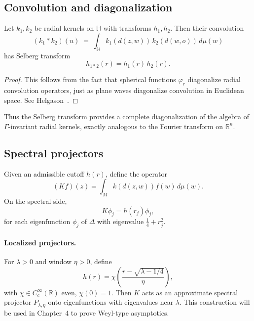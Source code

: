 
\subsection{Convolution and diagonalization}

\begin{lemma}
Let $k_1, k_2$ be radial kernels on $\mathbb{H}$ with transforms $h_1, h_2$.
Then their convolution
\[
  (k_1 * k_2)(u) \;=\; \int_{\mathbb{H}} k_1(d(z,w))\,k_2(d(w,o))\,d\mu(w)
\]
has Selberg transform
\[
  h_{1*2}(r) = h_1(r)\,h_2(r).
\]
\end{lemma}

\begin{proof}
This follows from the fact that spherical functions $\varphi_r$ diagonalize radial convolution operators, just as plane waves diagonalize convolution in Euclidean space. See Helgason~\cite{Helgason1984}.
\end{proof}

\begin{remark}
Thus the Selberg transform provides a complete diagonalization of the algebra of $\Gamma$-invariant radial kernels, exactly analogous to the Fourier transform on $\mathbb{R}^n$.
\end{remark}

\subsection{Spectral projectors}

Given an admissible cutoff $h(r)$, define the operator
\[
  (Kf)(z) = \int_{M} k(d(z,w)) f(w)\,d\mu(w).
\]
On the spectral side,
\[
  K \phi_j = h(r_j) \phi_j,
\]
for each eigenfunction $\phi_j$ of $\Delta$ with eigenvalue $\tfrac14+r_j^2$.

\paragraph{Localized projectors.}
For $\lambda>0$ and window $\eta>0$, define
\[
  h(r) = \chi\!\left(\frac{r-\sqrt{\lambda-1/4}}{\eta}\right),
\]
with $\chi\in C_c^\infty(\mathbb{R})$ even, $\chi(0)=1$.
Then $K$ acts as an approximate spectral projector $P_{\lambda,\eta}$ onto eigenfunctions with eigenvalues near $\lambda$.
This construction will be used in Chapter~4 to prove Weyl-type asymptotics.

